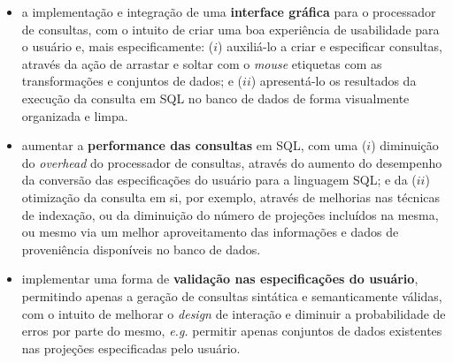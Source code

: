 \begin{itemize}
    \item a implementação e integração de uma \textbf{interface gráfica} para o processador de consultas, com o intuito de criar uma boa experiência de usabilidade para o usuário e, mais especificamente: (\(i\)) auxiliá-lo a criar e especificar consultas, através da ação de arrastar e soltar com o \textit{mouse} etiquetas com as transformações e conjuntos de dados; e (\(ii\)) apresentá-lo os resultados da execução da consulta em SQL no banco de dados de forma visualmente organizada e limpa.
    \item aumentar a \textbf{performance das consultas} em SQL, com uma (\(i\)) diminuição do \textit{overhead} do processador de consultas, através do aumento do desempenho da conversão das especificações do usuário para a linguagem SQL; e da (\(ii\)) otimização da consulta em si, por exemplo, através de melhorias nas técnicas de indexação, ou da diminuição do número de projeções incluídos na mesma, ou mesmo via um melhor aproveitamento das informações e dados de proveniência disponíveis no banco de dados.
    \item implementar uma forma de \textbf{validação nas especificações do usuário}, permitindo apenas a geração de consultas sintática e semanticamente válidas, com o intuito de melhorar o \textit{design} de interação e diminuir a probabilidade de erros por parte do mesmo, \textit{e.g.} permitir apenas conjuntos de dados existentes nas projeções especificadas pelo usuário.
\end{itemize}
